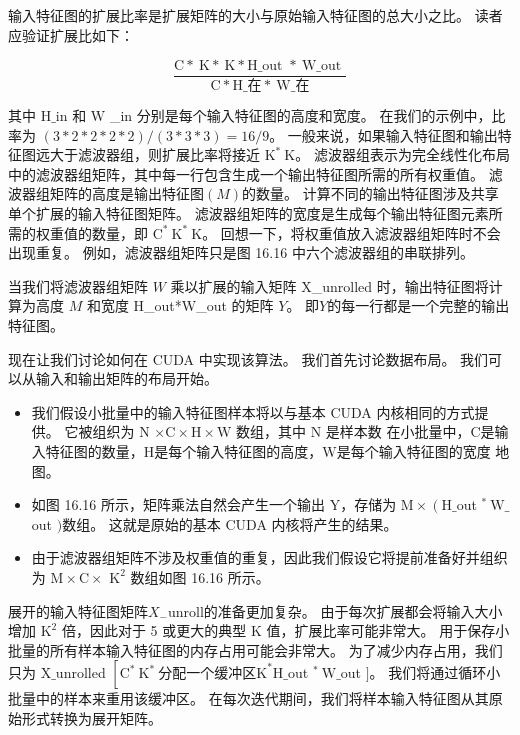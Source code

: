 输入特征图的扩展比率是扩展矩阵的大小与原始输入特征图的总大小之比。 读者应验证扩展比如下：

$$
\frac{\mathrm{C} * \mathrm{~K} * \mathrm{~K} * \mathrm{H} \_ \text {out } * \mathrm{~W} \_ \text {out }} {\mathrm{C} * \mathrm{H} \_ \text {在} * \mathrm{~W} \_ \text {在}}
$$

其中 $\mathrm{H} \_$in 和 $\mathrm{W}$ \_in 分别是每个输入特征图的高度和宽度。 在我们的示例中，比率为 $(3 * 2 * 2 * 2 * 2) /(3 * 3 * 3)=16 / 9$。 一般来说，如果输入特征图和输出特征图远大于滤波器组，则扩展比率将接近 $\mathrm{K}^{*} \mathrm{~K}$。 滤波器组表示为完全线性化布局中的滤波器组矩阵，其中每一行包含生成一个输出特征图所需的所有权重值。 滤波器组矩阵的高度是输出特征图$(M)$的数量。 计算不同的输出特征图涉及共享单个扩展的输入特征图矩阵。 滤波器组矩阵的宽度是生成每个输出特征图元素所需的权重值的数量，即 $\mathrm{C}^{*} \mathrm{~K}^{*} \mathrm{~ K}$。 回想一下，将权重值放入滤波器组矩阵时不会出现重复。 例如，滤波器组矩阵只是图 16.16 中六个滤波器组的串联排列。

当我们将滤波器组矩阵 $W$ 乘以扩展的输入矩阵 X\_unrolled 时，输出特征图将计算为高度 $M$ 和宽度 H\_out*W\_out 的矩阵 $Y$。 即$Y$的每一行都是一个完整的输出特征图。

现在让我们讨论如何在 CUDA 中实现该算法。 我们首先讨论数据布局。 我们可以从输入和输出矩阵的布局开始。

\begin{itemize}
   \item 我们假设小批量中的输入特征图样本将以与基本 CUDA 内核相同的方式提供。 它被组织为 $\mathrm{N}$ $\times \mathrm{C} \times \mathrm{H} \times \mathrm{W}$ 数组，其中 $\mathrm{N}$ 是样本数 在小批量中，$\mathrm{C}$是输入特征图的数量，$\mathrm{H}$是每个输入特征图的高度，$\mathrm{W}$是每个输入特征图的宽度 地图。

   \item 如图 16.16 所示，矩阵乘法自然会产生一个输出 Y，存储为 $\mathrm{M} \times\left(\mathrm{H} \_\right.$out ${ }^{ *} \mathrm{~W} \_$out $)$数组。 这就是原始的基本 CUDA 内核将产生的结果。

   \item 由于滤波器组矩阵不涉及权重值的重复，因此我们假设它将提前准备好并组织为 $\mathrm{M} \times \mathrm{C} \times$ $\mathrm{K }^{2}$ 数组如图 16.16 所示。

\end{itemize}

展开的输入特征图矩阵$X_{-}$unroll的准备更加复杂。 由于每次扩展都会将输入大小增加 $\mathrm{K}^{2}$ 倍，因此对于 5 或更大的典型 $\mathrm{K}$ 值，扩展比率可能非常大。 用于保存小批量的所有样本输入特征图的内存占用可能会非常大。 为了减少内存占用，我们只为 $\mathrm{X} \_$unrolled $\left[\mathrm{C}^{*} \mathrm{~K}^{*} \mathrm{~ 分配一个缓冲区 K}^{*} \mathrm{H} \_\right.$out ${ }^{*} \mathrm{~W} \_$out $]$。 我们将通过循环小批量中的样本来重用该缓冲区。 在每次迭代期间，我们将样本输入特征图从其原始形式转换为展开矩阵。

